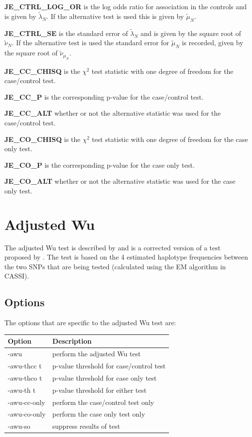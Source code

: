 \documentclass[a4paper,12pt]{article}
\begin{document}
{\bf JE\_CTRL\_LOG\_OR} is the log odds ratio for association in the controls and is given by $\tilde{\lambda}_N$. If the alternative test is used this is given by $\tilde{\mu}_N$. 

{\bf JE\_CTRL\_SE} is the standard error of $\tilde{\lambda}_N$ and is given by the square root of $\tilde{\nu}_N$. If the alternative test is used the standard error for $\tilde{\mu}_N$ is recorded, given by the square root of $\tilde{\nu}_{\mu_N}$. 

{\bf JE\_CC\_CHISQ} is the $\chi^2$ test statistic with one degree of freedom for the case/control test. 

{\bf JE\_CC\_P} is the corresponding p-value for the case/control test. 

{\bf JE\_CC\_ALT} whether or not the alternative statistic was used for the case/control test. 

{\bf JE\_CO\_CHISQ} is the $\chi^2$ test statistic with one degree of freedom for the case only test. 

{\bf JE\_CO\_P} is the corresponding p-value for the case only test. 

{\bf JE\_CO\_ALT} whether or not the alternative statistic was used for the case only test. 




\section{Adjusted Wu}
\label{adjusted-wu}

The adjusted Wu test is described by \citet{ueki:etal:12} and is a corrected version of a test proposed by \citet{Wu:etal:2010} . The test is based on the 4 estimated haplotype frequencies between the two SNPs that are being tested (calculated using the EM algorithm in CASSI). 
\subsection{Options}
\label{awu-options}

The options that are specific to the adjusted Wu test are: 

{\begin{center}\begin{tabular}{ll}
Option  & Description\\
\hline
-awu  & perform the adjusted Wu test\\
-awu-thcc t  & p-value threshold for case/control test\\
-awu-thco t  & p-value threshold for case only test\\
-awu-th t  & p-value threshold for either test\\
-awu-cc-only  & perform the case/control test only\\
-awu-co-only  & perform the case only test only\\
-awu-so  & suppress results of test\\
\end{tabular}\end{center}}
\end{document}
